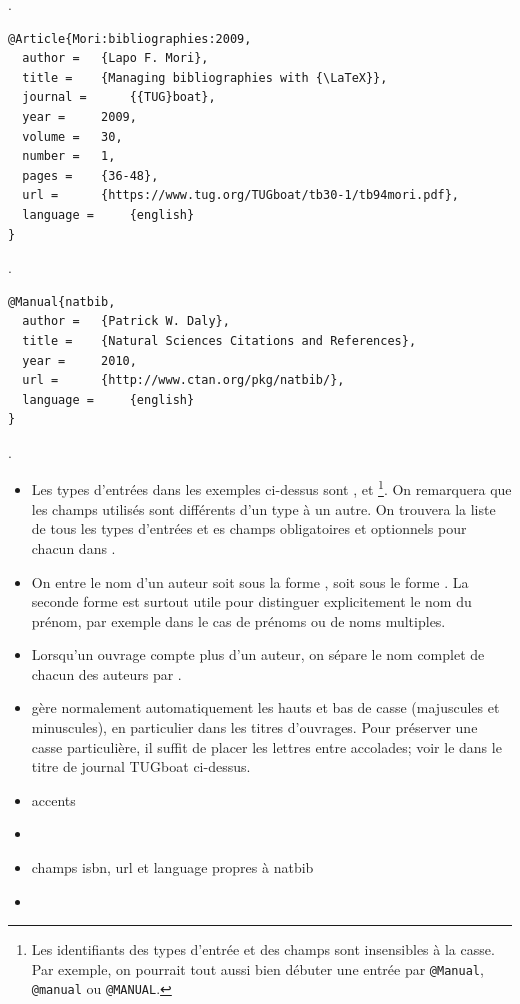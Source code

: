 \begin{framed}
  \noindent {}.
\end{framed}

\begin{lstlisting}
@Article{Mori:bibliographies:2009,
  author = 	 {Lapo F. Mori},
  title = 	 {Managing bibliographies with {\LaTeX}},
  journal = 	 {{TUG}boat},
  year = 	 2009,
  volume = 	 30,
  number = 	 1,
  pages = 	 {36-48},
  url =		 {https://www.tug.org/TUGboat/tb30-1/tb94mori.pdf},
  language = 	 {english}
}
\end{lstlisting}

\begin{framed}
\noindent {}.
\end{framed}

\begin{lstlisting}
@Manual{natbib,
  author = 	 {Patrick W. Daly},
  title = 	 {Natural Sciences Citations and References},
  year = 	 2010,
  url = 	 {http://www.ctan.org/pkg/natbib/},
  language = 	 {english}
}
\end{lstlisting}

\begin{framed}
\noindent {}.
\end{framed}

\begin{itemize}
\item Les types d'entrées dans les exemples ci-dessus sont
  ,  et \footnote{%
    Les identifiants des types d'entrée et des champs sont insensibles
    à la casse. Par exemple, on pourrait tout aussi bien débuter une
    entrée par \verb=@Manual=, \verb=@manual= ou \verb=@MANUAL=.}. %
  On remarquera que les champs utilisés sont différents d'un type à un
  autre. On trouvera la liste de tous les types d'entrées et es champs
  obligatoires et optionnels pour chacun dans \citet{wikipedia:bibtex}.
\item On entre le nom d'un auteur soit sous la forme , soit sous le forme . La seconde forme est
  surtout utile pour distinguer explicitement le nom du prénom, par
  exemple dans le cas de prénoms ou de noms multiples.
\item Lorsqu'un ouvrage compte plus d'un auteur, on sépare le nom
  complet de chacun des auteurs par .
\item {\BibTeX} gère normalement automatiquement les hauts et bas de
  casse (majuscules et minuscules), en particulier dans les titres
  d'ouvrages. Pour préserver une casse particulière, il suffit de
  placer les lettres entre accolades; voir le  dans le titre de
  journal TUGboat ci-dessus.
\item accents
\item
\item champs isbn, url et language propres à natbib
\item
\end{itemize}




